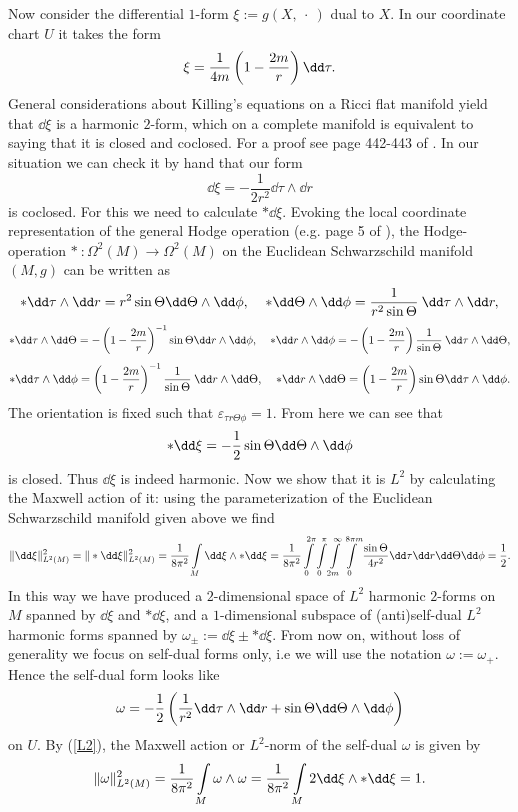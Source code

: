 \documentclass[a4paper,12pt,draft]{article}
\begin{document}
Now consider the differential $1$-form $\xi :=g(X,\:\cdot\:)$ 
dual to $X$. In our coordinate chart $U$ it takes the form 
$$\xi={1\over 4m}\left(1-{2m\over r}\right)\dd\tau .$$ 
General considerations about 
Killing's equations on a Ricci flat manifold yield that $\dd\xi$ is a 
harmonic $2$-form, which on a complete manifold is equivalent to saying that 
it is closed and coclosed. For a proof see page 442-443 of \cite{wald}. 
In our situation we can check it by hand that 
our form $$\dd\xi=-\frac{1}{2r^2}\dd\tau\wedge\dd r$$ 
is coclosed. For this we need to calculate $*\dd\xi$. Evoking the local
coordinate representation of the general Hodge operation
(e.g. page 5 of \cite{ble}), the Hodge-operation
$*\::\Omega^2(M)\rightarrow\Omega^2(M)$ on the Euclidean Schwarzschild 
manifold $(M, g)$ can be written as
\[*\dd\tau\wedge\dd r=r^2\sin\Theta\dd\Theta\wedge\dd\phi 
,\:\:\:\:\:*\dd\Theta\wedge\dd\phi
={1\over r^2\sin\Theta}\:\dd\tau\wedge\dd r ,\]
\[*\dd\tau\wedge\dd\Theta =-\left(1-{2m\over
r}\right)^{-1}\sin\Theta\dd r\wedge\dd\phi ,\:\:\:\:\:
*\dd r\wedge\dd\phi =-\left(1-{2m\over
r}\right){1\over \sin\Theta}\:\dd\tau\wedge\dd\Theta,\]
\[*\dd\tau\wedge\dd\phi=\left(1-{2m\over
r}\right)^{-1}{1\over\sin\Theta}\:\dd
r\wedge\dd\Theta ,\:\:\:\:\:*\dd r\wedge\dd\Theta=\left(1-
{2m\over r}\right)\sin\Theta\dd\tau\wedge\dd\phi .\]
The orientation is fixed such that $\varepsilon_{\tau r\Theta\phi}=1$.
From here we can see that $$*\dd\xi
=-{1\over 2}\sin\Theta\dd\Theta\wedge\dd\phi $$ is closed.
Thus $\dd\xi$ is indeed harmonic. Now we show that it is $L^2$
by calculating the Maxwell action of it:
using the parameterization of the Euclidean Schwarzschild manifold given
above we find  
\begin{eqnarray}
\Vert\dd\xi\Vert^2_{L^2(M)}=\Vert *\dd\xi\Vert^2_{L^2(M)}={1\over
8\pi^2}\int\limits_M \dd\xi\wedge *\dd\xi ={1\over
8\pi^2}\int\limits_0^{2\pi}\int\limits_0^\pi\int\limits_{2m}^\infty
\int\limits_0^{8\pi m}{\sin\Theta\over 4r^2}\dd
\tau\dd r\dd\Theta\dd\phi ={1\over 2}. 
\label{L2}
\end{eqnarray}
In this way we have produced a $2$-dimensional 
space of $L^2$ harmonic $2$-forms on $M$ spanned by $\dd\xi$ and
$*\dd\xi$, and a $1$-dimensional subspace of (anti)self-dual $L^2$
harmonic forms spanned by $\omega_\pm :=\dd\xi\pm *\dd\xi$. From now on,
without loss of generality we focus on self-dual forms only, i.e we
will use the notation $\omega:=\omega_+$. Hence the self-dual form
looks like
\begin{eqnarray}
\omega =-{1\over 2}\left({1\over r^2}\dd\tau\wedge\dd
r+\sin\Theta\dd\Theta\wedge\dd\phi\right)
\label{ehgorbulet}
\end{eqnarray}
on $U$. By (\ref{L2}), the Maxwell action or
$L^2$-norm of the self-dual $\omega$ is
given by
\begin{eqnarray}
\Vert\omega\Vert^2_{L^2(M)}={1\over
8\pi^2}\int\limits_M \omega\wedge\omega = {1\over
8\pi^2}\int\limits_M2\dd\xi\wedge *\dd\xi = 1. 
\label{energy}
\end{eqnarray}
\end{document}
